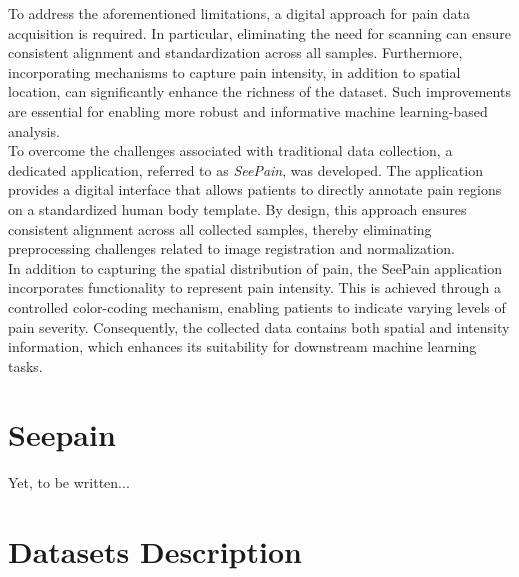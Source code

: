 \documentclass[12pt]{report}
\begin{document}
To address the aforementioned limitations, a digital approach for pain data acquisition is required. In particular, eliminating the need for scanning can ensure consistent alignment and standardization across all samples. Furthermore, incorporating mechanisms to capture pain intensity, in addition to spatial location, can significantly enhance the richness of the dataset. Such improvements are essential for enabling more robust and informative machine learning-based analysis.\\


To overcome the challenges associated with traditional data collection, a dedicated application, referred to as \textit{SeePain}, was developed. The application provides a digital interface that allows patients to directly annotate pain regions on a standardized human body template. By design, this approach ensures consistent alignment across all collected samples, thereby eliminating preprocessing challenges related to image registration and normalization.\\

In addition to capturing the spatial distribution of pain, the SeePain application incorporates functionality to represent pain intensity. This is achieved through a controlled color-coding mechanism, enabling patients to indicate varying levels of pain severity. Consequently, the collected data contains both spatial and intensity information, which enhances its suitability for downstream machine learning tasks.

\section{Seepain}
Yet, to be written...

\section{Datasets Description}
\end{document}
